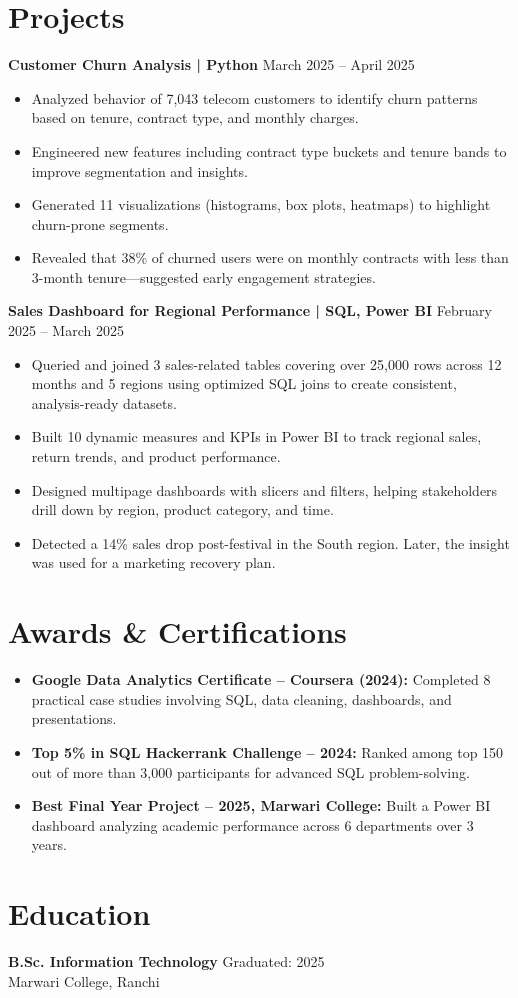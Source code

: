 \documentclass[11pt,a4paper]{article}
\begin{document}
\section*{Projects}
\textbf{Customer Churn Analysis | Python} \hfill March 2025 -- April 2025
\begin{itemize}
\item Analyzed behavior of 7,043 telecom customers to identify churn patterns based on tenure, contract type, and monthly charges.
\item Engineered new features including contract type buckets and tenure bands to improve segmentation and insights.
\item Generated 11 visualizations (histograms, box plots, heatmaps) to highlight churn-prone segments.
\item Revealed that 38\% of churned users were on monthly contracts with less than 3-month tenure—suggested early engagement strategies.
\end{itemize}

\textbf{Sales Dashboard for Regional Performance | SQL, Power BI} \hfill February 2025 -- March 2025
\begin{itemize}
\item Queried and joined 3 sales-related tables covering over 25,000 rows across 12 months and 5 regions using optimized SQL joins to create consistent, analysis-ready datasets.
\item Built 10 dynamic measures and KPIs in Power BI to track regional sales, return trends, and product performance.
\item Designed multipage dashboards with slicers and filters, helping stakeholders drill down by region, product category, and time.
\item Detected a 14\% sales drop post-festival in the South region. Later, the insight was used for a marketing recovery plan.
\end{itemize}

\section*{Awards \& Certifications}
\begin{itemize}
\item \textbf{Google Data Analytics Certificate -- Coursera (2024):} Completed 8 practical case studies involving SQL, data cleaning, dashboards, and presentations.
\item \textbf{Top 5\% in SQL Hackerrank Challenge -- 2024:} Ranked among top 150 out of more than 3,000 participants for advanced SQL problem-solving.
\item \textbf{Best Final Year Project -- 2025, Marwari College:} Built a Power BI dashboard analyzing academic performance across 6 departments over 3 years.
\end{itemize}

\section*{Education}
\textbf{B.Sc. Information Technology} \hfill Graduated: 2025 \\
Marwari College, Ranchi
\end{document}
